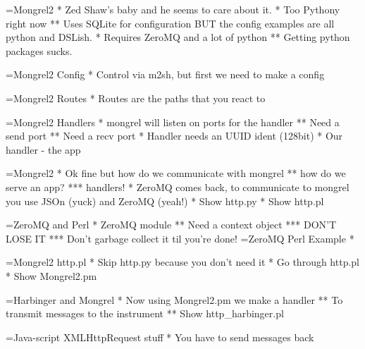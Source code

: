 \documentclass[titlepage,usenames,a4,landscape,semhelv]{seminar}
\begin{document}
\begin{slide}
=Mongrel2
* Zed Shaw's baby and he seems to care about it.
* Too Pythony right now
** Uses SQLite for configuration BUT the config examples are all
python and DSLish.
* Requires ZeroMQ and a lot of python 
** Getting python packages sucks.

=Mongrel2 Config
* Control via m2sh, but first we need to make a config

=Mongrel2 Routes
* Routes are the paths that you react to

=Mongrel2 Handlers
* mongrel will listen on ports for the handler
** Need a send port 
** Need a recv port
* Handler needs an UUID ident (128bit)
* Our handler - the app

=Mongrel2
* Ok fine but how do we communicate with mongrel
** how do we serve an app?
*** handlers!
* ZeroMQ comes back, to communicate to mongrel you use JSOn (yuck) and
ZeroMQ (yeah!)
* Show http.py 
* Show http.pl 


=ZeroMQ and Perl
* ZeroMQ module
** Need a context object 
*** DON'T LOSE IT
*** Don't garbage collect it til you're done!
=ZeroMQ Perl Example
* 

=Mongrel2 http.pl
* Skip http.py because you don't need it
* Go through http.pl
* Show Mongrel2.pm

=Harbinger and Mongrel
* Now using Mongrel2.pm we make a handler
** To transmit messages to the instrument
** Show http\_harbinger.pl

=Java-script XMLHttpRequest stuff
* You have to send messages back


\end{slide}
\end{document}

